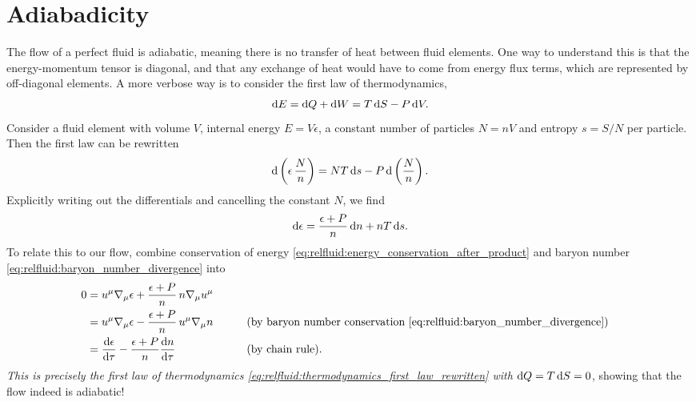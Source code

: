 \section{Adiabadicity}
\label{sec:relfluid:adiabadicity}

The flow of a perfect fluid is adiabatic, meaning there is no transfer of heat between fluid elements.
One way to understand this is that the energy-momentum tensor is diagonal, and that any exchange of heat would have to come from energy flux terms, which are represented by off-diagonal elements.
A more verbose way is to consider the first law of thermodynamics,
\begin{equation}
	\mathop{}\!\mathrm{d} E = \mathop{}\!\mathrm{d} Q + \mathop{}\!\mathrm{d} W = T \mathop{}\!\mathrm{d} S - P \mathop{}\!\mathrm{d} V .
\end{equation}
Consider a fluid element with volume $V$, internal energy $E = V \epsilon$, a constant number of particles $N = n V$ and entropy $s = S/N$ per particle.
Then the first law can be rewritten
\begin{equation}
	\mathop{}\!\mathrm{d} \left( \epsilon \, \frac{N}{n} \right) = N T \mathop{}\!\mathrm{d} s - P \mathop{}\!\mathrm{d} \left( \frac{N}{n} \right) .
\end{equation}
Explicitly writing out the differentials and cancelling the constant $N$, we find
\begin{equation}
	\mathop{}\!\mathrm{d} \epsilon = \frac{\epsilon + P}{n} \mathop{}\!\mathrm{d} n + n T \mathop{}\!\mathrm{d} s .
\label{eq:relfluid:thermodynamics_first_law_rewritten}
\end{equation}
To relate this to our flow, combine conservation of energy \eqref{eq:relfluid:energy_conservation_after_product} and baryon number \eqref{eq:relfluid:baryon_number_divergence} into
\begin{equation}
\begin{aligned}
	0 &= u^\mu \nabla_\mu \epsilon + \frac{\epsilon+P}{n} \, n \nabla_\mu u^\mu \\
	  &= u^\mu \nabla_\mu \epsilon - \frac{\epsilon+P}{n} \, u^\mu \nabla_\mu n && \qquad \text{(by baryon number conservation \eqref{eq:relfluid:baryon_number_divergence})} \\
	  &= \odv{\epsilon}{\tau} - \frac{\epsilon+P}{n} \odv{n}{\tau}      && \qquad \text{(by chain rule)} . \\
\end{aligned}
\label{eq:relfluid:energy_conservation_rewritten}
\end{equation}
\emph{This is precisely the first law of thermodynamics \eqref{eq:relfluid:thermodynamics_first_law_rewritten} with $\mathop{}\!\mathrm{d} Q = T \mathop{}\!\mathrm{d} S = 0$}, showing that the flow indeed is adiabatic!

